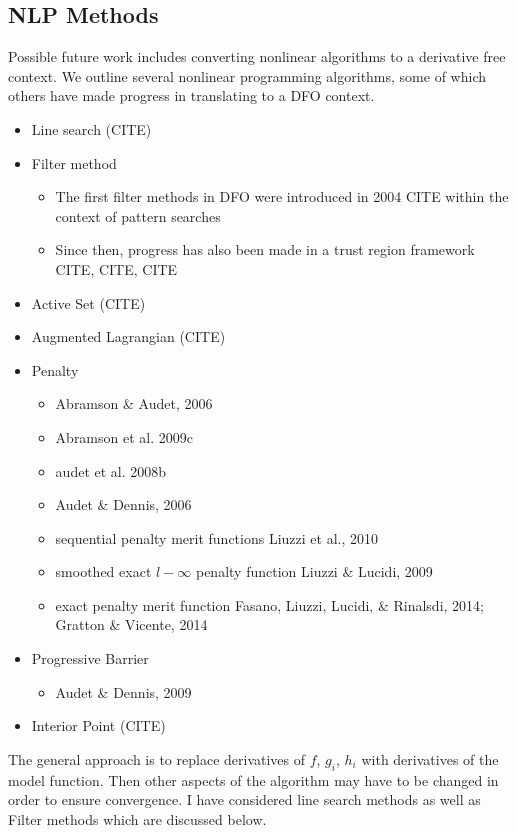 \documentclass{article}
\begin{document}
\subsection{NLP Methods}

Possible future work includes converting nonlinear algorithms to a derivative free context.
We outline several nonlinear programming algorithms, some of which others have made progress in translating to a DFO context.

\begin{itemize}
	\item Line search (CITE)
	\item Filter method
	\begin{itemize}
		\item The first filter methods in DFO were introduced in 2004 CITE within the context of pattern searches
		\item Since then, progress has also been made in a trust region framework CITE, CITE, CITE
	\end{itemize}
	\item Active Set (CITE)
	\item Augmented Lagrangian (CITE)
	\item Penalty
	\begin{itemize}
		\item Abramson \& Audet, 2006
		\item Abramson et al. 2009c
		\item audet et al. 2008b
		\item Audet \& Dennis, 2006
		\item sequential penalty merit functions Liuzzi et al., 2010
		\item smoothed exact $l-\infty$ penalty function Liuzzi \& Lucidi, 2009
		\item exact penalty merit function Fasano, Liuzzi, Lucidi, \& Rinalsdi, 2014; Gratton \& Vicente, 2014
	\end{itemize}
	\item Progressive Barrier
	\begin{itemize}
		\item Audet \& Dennis, 2009
	\end{itemize}
	\item Interior Point (CITE)
\end{itemize}

The general approach is to replace derivatives of $f$, $g_i$, $h_i$ with derivatives of the model function.
Then other aspects of the algorithm may have to be changed in order to ensure convergence.
I have considered line search methods as well as Filter methods which are discussed below.
\end{document}

